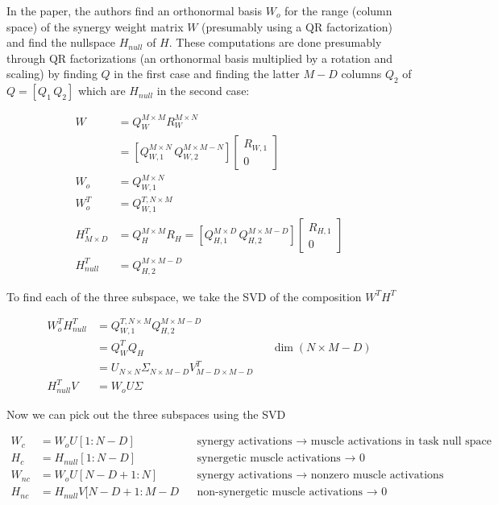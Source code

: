 \documentclass[../main.tex]{subfiles}
\begin{document}
{{{{{{{{{{{In the paper, the authors find an orthonormal basis \(W_o\) for the
range (column space) of the synergy weight matrix \(W\) (presumably
using a QR factorization) and find the nullspace \(H_{null}\) of \(H\).
These computations are done presumably through QR factorizations (an
orthonormal basis multiplied by a rotation and scaling) by finding \(Q\)
in the first case and finding the latter \(M-D\) columns \(Q_2\) of
\(Q = [Q_1 \, Q_2]\) which are \(H_{null}\) in the second case:

\begin{align*}
    W &= Q_W^{M\times M}R_W^{M\times N} \\
      &= \left[Q_{W,1}^{M\times N}\,Q_{W,2}^{M\times M-N}\right]\begin{bmatrix}R_{W,1} \\ 0 \end{bmatrix} \\
    W_o &= Q_{W,1}^{M\times N} \\
    W_o^T &= Q_{W,1}^{T, N\times M} \\
    H^T_{M\times D} &= Q_H^{M\times M}R_H = \left[Q_{H,1}^{M\times D}\,Q_{H,2}^{M\times M-D}\right]\begin{bmatrix}R_{H,1} \\ 0 \end{bmatrix} \\
    H^T_{null} &= Q_{H,2}^{M\times M-D}
\end{align*}

To find each of the three subspace, we take the SVD of the composition
\(W^TH^T\)

\begin{align*}
    W_o^TH^T_{null} &= Q_{W,1}^{T, N\times M} Q_{H,2}^{M\times M-D} \\
    &= Q^T_WQ_H && \dim(N \times M-D) \\
    &= U_{N\times N}\Sigma_{N \times M-D} V^T_{M-D\times M-D} \\
    H^T_{null}V &= W_oU\Sigma
\end{align*}

Now we can pick out the three subspaces using the SVD

\begin{align*}
    W_c &= W_oU[1:N-D] && \text{synergy activations $\rightarrow$ muscle activations in task null space}\\
    H_c &= H_{null}[1:N-D] && \text{synergetic muscle activations $\rightarrow$ 0} \\
    W_{nc} &= W_oU[N-D+1:N] && \text{synergy activations $\rightarrow$ nonzero muscle activations}\\
    H_{nc} &= H_{null}V[N-D+1:M-D && \text{non-synergetic muscle activations $\rightarrow$ 0} \\
\end{align*}

}}}}}}}}}}}
\end{document}
